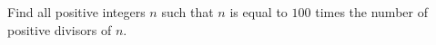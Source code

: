Find all positive integers $n$ such that $n$ is equal to $100$ times the number of positive divisors of $n$.